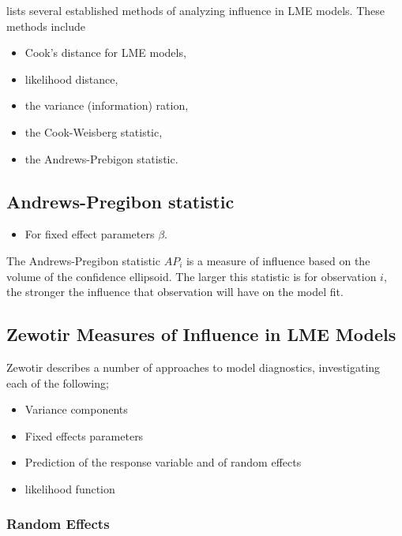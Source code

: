 \documentclass[Main.tex]{subfiles}
\begin{document}
\citet{Zewotir} lists several established methods of analyzing influence in LME models. These methods include \begin{itemize}
	\item Cook's distance for LME models,
	\item {} likelihood distance,
	\item the variance (information) ration,
	\item the  Cook-Weisberg statistic,
	\item the  Andrews-Prebigon statistic.
\end{itemize}


	
	\subsection{Andrews-Pregibon statistic} %
	\begin{itemize}
		\item For fixed effect parameters $\beta$.
	\end{itemize}
	The Andrews-Pregibon statistic $AP_{i}$ is a measure of influence based on the volume of the confidence ellipsoid.
	The larger this statistic is for observation $i$, the stronger the influence that observation will have on the model fit.


		
	
	
	
	\subsection{Zewotir Measures of Influence in LME Models}%
	Zewotir describes a number of approaches to model diagnostics, investigating each of the following;
	\begin{itemize}
		\item Variance components
		\item Fixed effects parameters
		\item Prediction of the response variable and of random effects
		\item likelihood function
	\end{itemize}
	
	
	\newpage
	\subsubsection{Random Effects}
	
\end{document}
